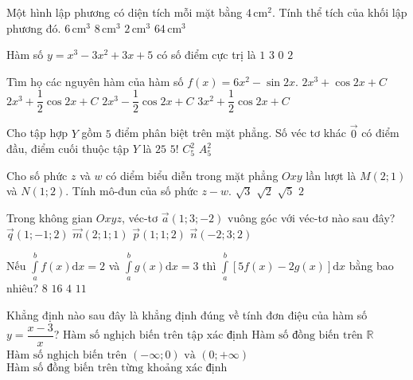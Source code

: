 \begin{ex}%
Một hình lập phương có diện tích mỗi mặt bằng $4\mathrm{\,cm}^2$. Tính thể tích của khối lập phương đó.
\choice
{$6\mathrm{\,cm}^3$}
{\True $8\mathrm{\,cm}^3$}
{$2\mathrm{\,cm}^3$}
{$64\mathrm{\,cm}^3$}

\end{ex}
\begin{ex}%
Hàm số $y=x^3-3 x^2+3 x+5$ có số điểm cực trị là
\choice
{$1$}
{$3$}
{\True $0$}
{$2$}

\end{ex}
\begin{ex}%
Tìm họ các nguyên hàm của hàm số $f(x)=6 x^2-\sin 2 x$.
\choice
{$2 x^3+\cos 2 x+C$}
{\True $2 x^3+\dfrac{1}{2} \cos 2 x+C$}
{$2 x^3-\dfrac{1}{2} \cos 2 x+C$}
{$3 x^2+\dfrac{1}{2} \cos 2 x+C$}

\end{ex}
\begin{ex}%
Cho tập hợp $Y$ gồm $5$ điểm phân biệt trên mặt phẳng. Số véc tơ khác $\overrightarrow{0}$ có điểm đầu, điểm cuối thuộc tập $Y$ là
\choice
{$25$}
{$5!$}
{$C_5^2$}
{\True $A_5^2$}

\end{ex}
\begin{ex}%
Cho số phức $z$ và $w$ có diểm biểu diễn trong mặt phẳng $O x y$ lần lượt là $M(2; 1)$ và $N(1; 2)$. Tính mô-đun của số phức $z-w$.
\choice
{$\sqrt{3}$}
{\True $\sqrt{2}$}
{$\sqrt{5}$}
{$2$}

\end{ex}
\begin{ex}%
Trong không gian $Oxyz$, véc-tơ $\vec{a}(1; 3;-2)$ vuông góc với véc-tơ nào sau đây?
\choice
{$\vec{q}(1;-1; 2)$}
{$\vec{m}(2; 1; 1)$}
{\True $\vec{p}(1; 1; 2)$}
{$\vec{n}(-2; 3; 2)$}

\end{ex}
\begin{ex}%
Nếu $\displaystyle\int\limits_a^{b} f(x) \mathrm{d} x=2$ và $\displaystyle\int\limits_a^{b} g(x) \mathrm{d} x=3$ thì $\displaystyle\int\limits_a^{b}[5 f(x)-2 g(x)] \mathrm{d} x$ bằng bao nhiêu?
\choice
{$8$}
{$16$}
{\True $4$}
{$11$}

\end{ex}
\begin{ex}%
Khẳng định nào sau đây là khẳng định đúng về tính đơn điệu của hàm số $y=\dfrac{x-3}{x}$?
\choice
{$\text{Hàm số nghịch biến trên tập xác định}$}
{$\text{Hàm số đồng biến trên}$ $\mathbb{R}$}
{$\text{Hàm số nghịch biến trên}$ $(-\infty; 0)$ $\text{và}$ $(0;+\infty)$}
{\True $\text{Hàm số đồng biến trên từng khoảng xác định}$}

\end{ex}
